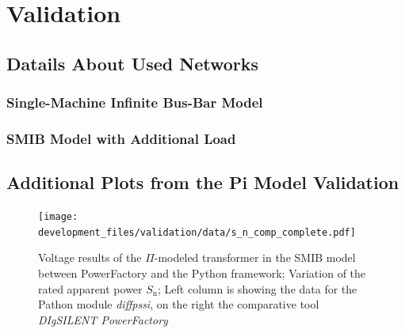 

\chapter{Validation}
\label{app:validation}

\section{Datails About Used Networks}
\label{app:networks}

\subsection{Single-Machine Infinite Bus-Bar Model}
\label{app:smib-model}


\subsection{SMIB Model with Additional Load}
\label{app:smib-w-load}



\section{Additional Plots from the  Pi Model Validation}
\label{app:add-validation-plots}

\begin{figure}[H]
    \centering
    \texttt{[image: development\_files/validation/data/s\_n\_comp\_complete.pdf]}
    \caption[Model results concerning the variation of the rated apparent power]{Voltage results of the $\Pi$-modeled transformer in the \acs{SMIB} model between PowerFactory and the Python framework; Variation of the rated apparent power $S_\mathrm{n}$; Left column is showing the data for the Pathon module \textit{diffpssi}, on the right the comparative tool \textit{DIgSILENT PowerFactory}}
    \label{fig:valid-s-compl}
\end{figure}

